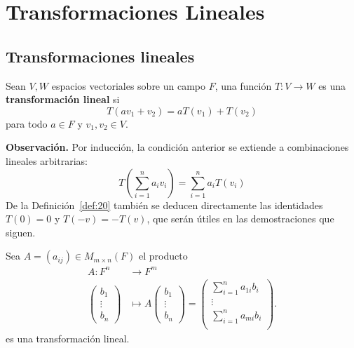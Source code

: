 \documentclass[12pt,a4paper]{book}
\newcommand{\parentesis}[1]{\left(#1\right)}
\begin{document}
    \ncinterludio
    \chapter{Transformaciones Lineales}

    \section{Transformaciones lineales}


    \begin{definicion}
    \label{def:20}
        Sean $V,W$ espacios vectoriales sobre un campo $F$, una función $T:V\to W$ es una
        \textbf{transformación lineal} si
        \begin{equation*}
            T(av_{1}+v_{2})=aT(v_{1})+T(v_{2})
        \end{equation*}
        para todo $a\in F$ y $v_{1},v_{2}\in V$.
    \end{definicion}

    \textbf{Observación.}
    Por inducción, la condición anterior se extiende a combinaciones lineales arbitrarias:
    \begin{equation*}
        T\parentesis{\sum_{i = 1}^{n}a_{i}v_{i}} = \sum_{i = 1}^{n}a_{i}T(v_{i})
    \end{equation*}
    De la Definición~\ref{def:20} también se deducen directamente las identidades $T(0)=0$ y $T(-v)=-T(v)$, que serán útiles en las demostraciones que siguen.

    \begin{ejemplo}
    \label{ej:20}
        Sea $A = (a_{ij}) \in M_{m \times n}(F)$ el producto
        \begin{align*}
            A:F^{n} & \to F^{m}\\
            \begin{pmatrix}
                b_{1}\\
                \vdots\\
                b_{n}
            \end{pmatrix}
            & \mapsto A\begin{pmatrix}
                b_{1}\\
                \vdots\\
                b_{n}
            \end{pmatrix} = 
            \begin{pmatrix}
                \sum_{i = 1}^{n}a_{1i}b_{i}\\
                \vdots\\
                \sum_{i = 1}^{n}a_{mi}b_{i}\\
            \end{pmatrix}.
        \end{align*}
        es una transformación lineal.
    \end{ejemplo}
\end{document}
